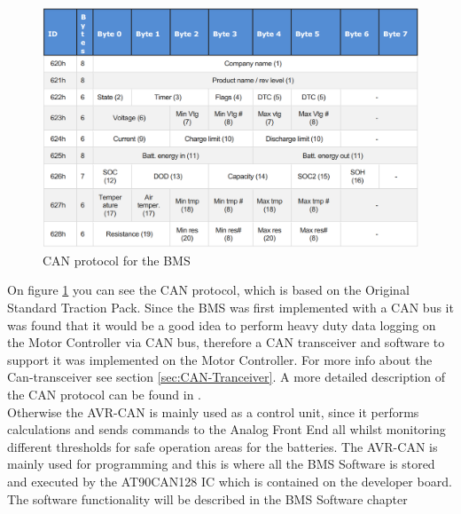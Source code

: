 \begin{figure}[H]
	\centering
	\includegraphics[width=1.0\linewidth]{Hardware/Pictures/BMSCANProto}
	\caption[Empty]{CAN protocol for the BMS\footnotemark}
	\label{fig:BMSCANProto}
\end{figure}

On figure \ref{fig:BMSCANProto} you can see the CAN protocol, which is based on the Original Standard Traction Pack. Since the BMS was first implemented with a CAN bus it was found that it would be a good idea to perform heavy duty data logging on the Motor Controller via CAN bus, therefore a CAN transceiver and software to support it was implemented on the Motor Controller. For more info about the Can-transceiver see section \ref{sec:CAN-Tranceiver}. A more detailed description of the CAN protocol can be found in .\\
Otherwise the AVR-CAN is mainly used as a control unit, since it performs calculations and sends commands to the Analog Front End all whilst monitoring different thresholds for safe operation areas for the batteries. The AVR-CAN is mainly used for programming and this is where all the BMS Software is stored and executed by the AT90CAN128 IC which is contained on the developer board. The software functionality will be described in the BMS Software chapter  %

